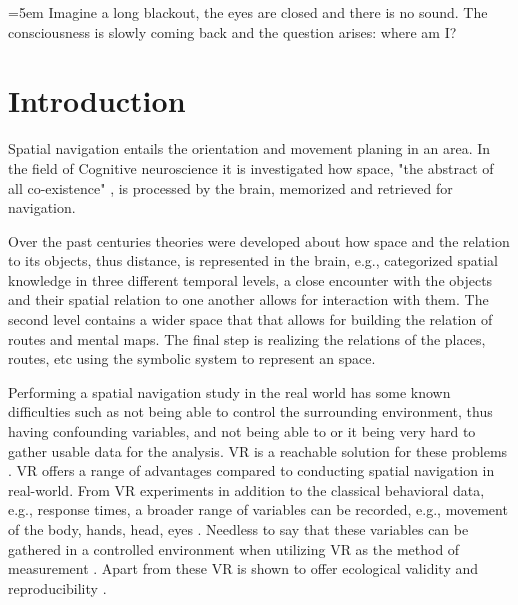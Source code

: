 \markboth{}{}

\begin{minipage}[l]{80mm}
	\vspace{120pt} 
	\leftskip=5em
	Imagine a long blackout, the eyes are closed and there is no sound. The consciousness is slowly coming back and the question arises: where am I?\\
\end{minipage}


\vspace{20pt}


\chapter{Introduction}


Spatial navigation entails the orientation and movement planing in an area. In the field of Cognitive neuroscience it is investigated how space, "the abstract of all co-existence" \autocite{spencer1989}, is processed by the brain, memorized and retrieved for navigation. 

Over the past centuries theories were developed about how space and the relation to its objects, thus distance, is represented in the brain, e.g., \textcite{cassirer1955philosophy} categorized spatial knowledge in three different temporal levels, a close encounter with the objects and their spatial relation to one another allows for interaction with them. The second level contains a wider space that that allows for building the relation of routes and mental maps. The final step is realizing the relations of the places, routes, etc using the symbolic system to represent an space. 

Performing a spatial navigation study in the real world has some known difficulties such as not being able to control the surrounding environment, thus having confounding variables, and not being able to or it being very hard to gather usable data for the analysis. VR is a reachable solution for these problems \autocite{diersch2019potential}. VR offers a range of advantages compared to conducting spatial navigation in real-world. From VR experiments in addition to the classical behavioral data, e.g., response times, a broader range of variables can be recorded, e.g., movement of the body, hands, head, eyes \autocite{pan2018and}. Needless to say that these variables can be gathered in a controlled environment when utilizing VR as the method of measurement \autocite{mcilvenny2020future}. Apart from these VR is shown to offer ecological validity \autocite{pan2018and, chicchi2017novel} and reproducibility \autocite{pan2018and}.

